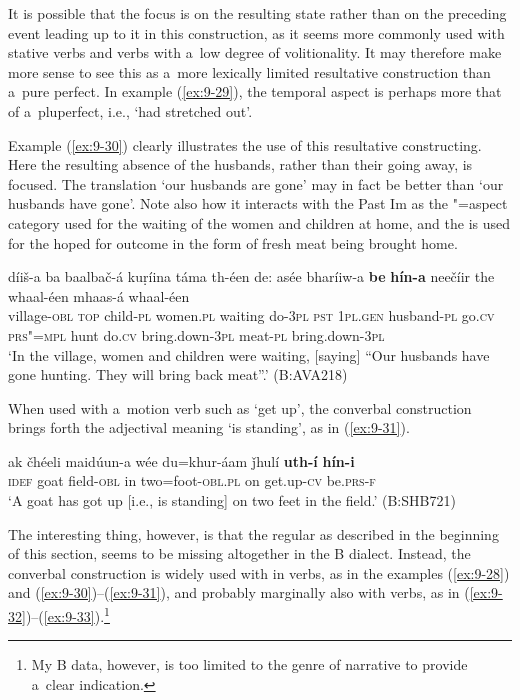 It is possible that the focus is on the resulting state rather than on the preceding event leading up to it in this construction, as it seems more commonly used with stative verbs and verbs with a~low degree of volitionality. It may therefore make more sense to see this as a~more lexically limited resultative construction \citep[135]{dahl1985} than a~pure perfect. In example (\ref{ex:9-29}), the temporal aspect is perhaps more that of a~pluperfect, i.e., `had stretched out'. 



Example (\ref{ex:9-30}) clearly illustrates the use of this resultative constructing. Here the resulting absence of the husbands, rather than their going away, is focused. The translation `our husbands are gone' may in fact be better than `our husbands have gone'. Note also how it interacts with the Past Im as the "=aspect category used for the waiting of the women and children at home, and the  is used for the hoped for outcome in the form of fresh meat being brought home.

\ea
\label{ex:9-30}
\gll díiš-a ba baalbač-á kuṛíina táma th-éen de: asée bharíiw-a \textbf{be} \textbf{hín-a} neečíir the whaal-éen mhaas-á whaal-éen \\
village-\textsc{obl} \textsc{top} child-\textsc{pl} women.\textsc{pl} waiting  do-\textsc{3pl} \textsc{pst } \textsc{1pl.gen} husband-\textsc{pl} go.\textsc{cv} \textsc{prs"=mpl}  hunt do.\textsc{cv} bring.down-\textsc{3pl} meat-\textsc{pl} bring.down-\textsc{3pl} \\
\glt `In the village, women and children were waiting, [saying] ``Our husbands have gone hunting. They will bring back meat''.' (B:AVA218)
\z

When used with a~motion verb such as `get up', the converbal construction brings forth the adjectival meaning `is standing', as in (\ref{ex:9-31}).

\begin{exe}
\ex
\label{ex:9-31}
\gll ak čhéeli maidúun-a wée du=khur-áam ǰhulí \textbf{uth-í} \textbf{hín-i} \\
\textsc{idef} goat field-\textsc{obl} in two=foot-\textsc{obl.pl} on get.up-\textsc{cv} be.\textsc{prs-f} \\
\glt `A goat has got up [i.e., is standing] on two feet in the field.' (B:SHB721)
\end{exe}

The interesting thing, however, is that the regular  as described in the beginning of this section, seems to be missing altogether in the B dialect. Instead, the converbal construction is widely used with in verbs, as in the examples (\ref{ex:9-28}) and (\ref{ex:9-30})--(\ref{ex:9-31}), and probably marginally also with  verbs, as in (\ref{ex:9-32})--(\ref{ex:9-33}).\footnote{My B data, however, is too limited to the genre of narrative  to provide a~clear indication.}

